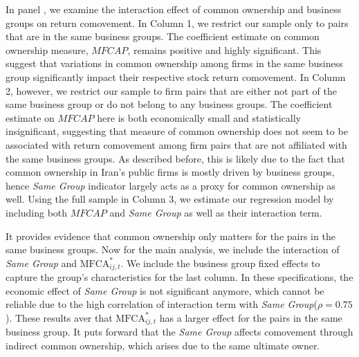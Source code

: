 	
	
	
	In panel , we examine the interaction effect of common ownership and business groups on return comovement. In Column 1, we restrict our sample only to pairs that are in the same business groups. The coefficient estimate on common ownership measure, $\textit{MFCAP}$, remains positive and highly significant. This suggest that variations in common ownership among firms in the same business group significantly impact their respective stock return comovement. In Column 2, however, we restrict our sample to firm pairs that are either not part of the same business group or do not belong to any business groups. The coefficient estimate on $\textit{MFCAP}$ here is both economically small and statistically insignificant, suggesting that measure of common ownership does not seem to be associated with return comovement among firm pairs that are not affiliated with the same business groups. As described before, this is likely due to the fact that common ownership in Iran's public firms is mostly driven by business groups, hence \textit{Same Group} indicator largely acts as a proxy for common ownership as well. Using the full sample in Column 3, we estimate our regression model by including both $\textit{MFCAP}$ and \textit{Same Group} as well as their interaction term.
	
	 It provides evidence that common ownership only matters for the pairs in the same business groups.
	Now for the main analysis, we include the interaction of \textit{Same Group} and $\text{MFCA}^*_{ij,t}$. We include the business group fixed effects to capture the group's characteristics for the last column. In these specifications, the economic effect of \textit{Same Group} is not significant anymore, which cannot be reliable due to the high correlation of interaction term with \textit{Same Group}($\rho = 0.75$). These results aver that $\text{MFCA}^*_{ij,t}$ has a larger effect for the pairs in the same business group. It puts forward that the \textit{Same Group}  affects comovement through indirect common ownership, which arises due to the same ultimate owner. 
	
	
	
